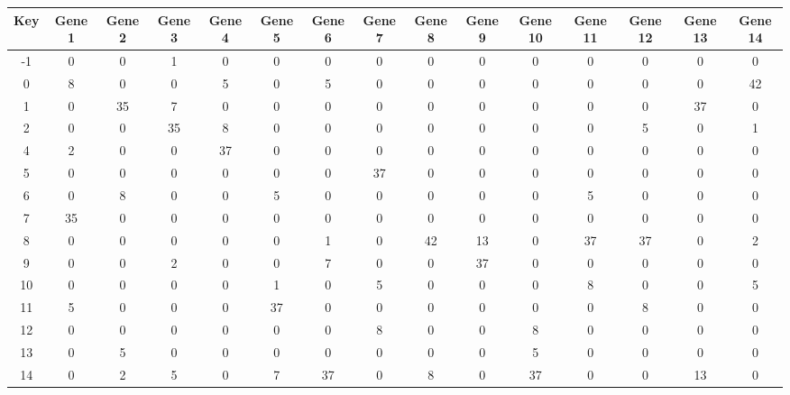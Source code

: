 \begin{tabular}{|c|c|c|c|c|c|c|c|c|c|c|c|c|c|c|}
\hline
Key & Gene 1 & Gene 2 & Gene 3 & Gene 4 & Gene 5 & Gene 6 & Gene 7 & Gene 8 & Gene 9 & Gene 10 & Gene 11 & Gene 12 & Gene 13 & Gene 14 \\
\hline
-1 & 0 & 0 & 1 & 0 & 0 & 0 & 0 & 0 & 0 & 0 & 0 & 0 & 0 & 0 \\
0 & 8 & 0 & 0 & 5 & 0 & 5 & 0 & 0 & 0 & 0 & 0 & 0 & 0 & 42 \\
1 & 0 & 35 & 7 & 0 & 0 & 0 & 0 & 0 & 0 & 0 & 0 & 0 & 37 & 0 \\
2 & 0 & 0 & 35 & 8 & 0 & 0 & 0 & 0 & 0 & 0 & 0 & 5 & 0 & 1 \\
4 & 2 & 0 & 0 & 37 & 0 & 0 & 0 & 0 & 0 & 0 & 0 & 0 & 0 & 0 \\
5 & 0 & 0 & 0 & 0 & 0 & 0 & 37 & 0 & 0 & 0 & 0 & 0 & 0 & 0 \\
6 & 0 & 8 & 0 & 0 & 5 & 0 & 0 & 0 & 0 & 0 & 5 & 0 & 0 & 0 \\
7 & 35 & 0 & 0 & 0 & 0 & 0 & 0 & 0 & 0 & 0 & 0 & 0 & 0 & 0 \\
8 & 0 & 0 & 0 & 0 & 0 & 1 & 0 & 42 & 13 & 0 & 37 & 37 & 0 & 2 \\
9 & 0 & 0 & 2 & 0 & 0 & 7 & 0 & 0 & 37 & 0 & 0 & 0 & 0 & 0 \\
10 & 0 & 0 & 0 & 0 & 1 & 0 & 5 & 0 & 0 & 0 & 8 & 0 & 0 & 5 \\
11 & 5 & 0 & 0 & 0 & 37 & 0 & 0 & 0 & 0 & 0 & 0 & 8 & 0 & 0 \\
12 & 0 & 0 & 0 & 0 & 0 & 0 & 8 & 0 & 0 & 8 & 0 & 0 & 0 & 0 \\
13 & 0 & 5 & 0 & 0 & 0 & 0 & 0 & 0 & 0 & 5 & 0 & 0 & 0 & 0 \\
14 & 0 & 2 & 5 & 0 & 7 & 37 & 0 & 8 & 0 & 37 & 0 & 0 & 13 & 0 \\
\hline
\end{tabular}